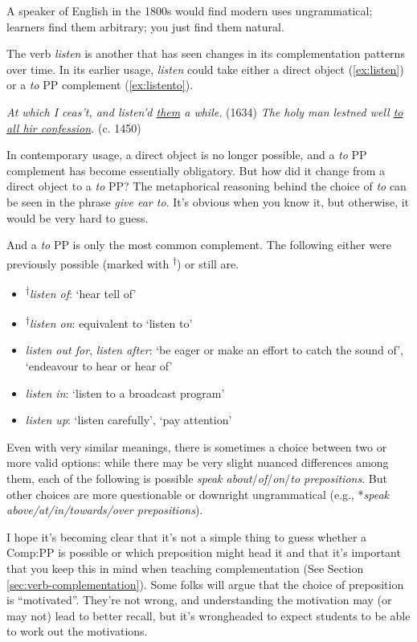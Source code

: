 A speaker of English in the 1800s would find modern uses ungrammatical;
learners find them arbitrary; you just find them natural.


The verb \textit{listen} is another that has seen changes in its complementation patterns over time. In its earlier usage, \textit{listen} could take either a direct object (\ref{ex:listen}) or
a \textit{to} PP complement (\ref{ex:listento}).

\ea \textit{At which I ceas't, and listen'd \uline{them} a while.} (1634)\label{ex:listen}
\z
\ea \textit{The holy man lestned well \uline{to all hir confession}.} (c. 1450)\label{ex:listento}
\z
    
In contemporary usage, a direct object is no longer possible, and a \textit{to} PP complement has become essentially obligatory. But how did it change from a direct
object to a \textit{to} PP? The metaphorical reasoning behind the choice of \textit{to} can be seen
in the phrase \textit{give ear to}. It's obvious when you know it, but otherwise, it would
be very hard to guess. 

And a \textit{to} PP is only the most common complement. The following either were previously possible (marked with \textsuperscript{†}) or still are.

\begin{itemize}
    \item \textsuperscript{†}\textit{listen of}: `hear tell of'
    \item \textsuperscript{†}\textit{listen on}: equivalent to `listen to'
    \item \textit{listen {\op}out{\cp} for}, \textit{listen after}: `be eager or make an effort to catch the sound of', `endeavour to hear or hear of'
    \item \textit{listen in}: `listen to a broadcast program'
    \item \textit{listen up}: `listen carefully', `pay attention'
\end{itemize}

Even with very similar meanings, there is sometimes a choice between two or more valid options: while there may be very slight nuanced differences among
them, each of the following is possible \textit{speak about}/\textit{of}/\textit{on}/\textit{to prepositions}. But
other choices are more questionable or downright ungrammatical (e.g., *\textit{speak
above/at/in/towards/over prepositions}).

I hope it's becoming clear that it's not a simple thing to guess whether a Comp:PP is possible or which preposition might head it and that it's important
that you keep this in mind when teaching complementation (See Section \ref{sec:verb-complementation}). Some folks will argue that the choice of preposition is ``motivated''. They're not
wrong, and understanding the motivation may (or may not) lead to better recall,
but it's wrongheaded to expect students to be able to work out the motivations.

